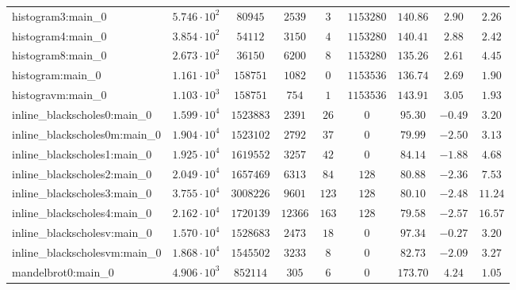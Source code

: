 \begin{tabular}{|l|c|c|c|c|c|c|c|c|}
histogram3:main\_0             & $ 5.746 \cdot 10^{2} $ & $ 80945    $ & $ 2539   $ & $ 3    $ & $ 1153280  $ & $ 140.86      $ & $ 2.90    $ & $ 2.26    $ \\
histogram4:main\_0             & $ 3.854 \cdot 10^{2} $ & $ 54112    $ & $ 3150   $ & $ 4    $ & $ 1153280  $ & $ 140.41      $ & $ 2.88    $ & $ 2.42    $ \\
histogram8:main\_0             & $ 2.673 \cdot 10^{2} $ & $ 36150    $ & $ 6200   $ & $ 8    $ & $ 1153280  $ & $ 135.26      $ & $ 2.61    $ & $ 4.45    $ \\
histogram:main\_0              & $ 1.161 \cdot 10^{3} $ & $ 158751   $ & $ 1082   $ & $ 0    $ & $ 1153536  $ & $ 136.74      $ & $ 2.69    $ & $ 1.90    $ \\
histogravm:main\_0             & $ 1.103 \cdot 10^{3} $ & $ 158751   $ & $ 754    $ & $ 1    $ & $ 1153536  $ & $ 143.91      $ & $ 3.05    $ & $ 1.93    $ \\
inline\_blackscholes0:main\_0  & $ 1.599 \cdot 10^{4} $ & $ 1523883  $ & $ 2391   $ & $ 26   $ & $ 0        $ & $ 95.30       $ & $ -0.49   $ & $ 3.20    $ \\
inline\_blackscholes0m:main\_0 & $ 1.904 \cdot 10^{4} $ & $ 1523102  $ & $ 2792   $ & $ 37   $ & $ 0        $ & $ 79.99       $ & $ -2.50   $ & $ 3.13    $ \\
inline\_blackscholes1:main\_0  & $ 1.925 \cdot 10^{4} $ & $ 1619552  $ & $ 3257   $ & $ 42   $ & $ 0        $ & $ 84.14       $ & $ -1.88   $ & $ 4.68    $ \\
inline\_blackscholes2:main\_0  & $ 2.049 \cdot 10^{4} $ & $ 1657469  $ & $ 6313   $ & $ 84   $ & $ 128      $ & $ 80.88       $ & $ -2.36   $ & $ 7.53    $ \\
inline\_blackscholes3:main\_0  & $ 3.755 \cdot 10^{4} $ & $ 3008226  $ & $ 9601   $ & $ 123  $ & $ 128      $ & $ 80.10       $ & $ -2.48   $ & $ 11.24   $ \\
inline\_blackscholes4:main\_0  & $ 2.162 \cdot 10^{4} $ & $ 1720139  $ & $ 12366  $ & $ 163  $ & $ 128      $ & $ 79.58       $ & $ -2.57   $ & $ 16.57   $ \\
inline\_blackscholesv:main\_0  & $ 1.570 \cdot 10^{4} $ & $ 1528683  $ & $ 2473   $ & $ 18   $ & $ 0        $ & $ 97.34       $ & $ -0.27   $ & $ 3.20    $ \\
inline\_blackscholesvm:main\_0 & $ 1.868 \cdot 10^{4} $ & $ 1545502  $ & $ 3233   $ & $ 8    $ & $ 0        $ & $ 82.73       $ & $ -2.09   $ & $ 3.27    $ \\
mandelbrot0:main\_0            & $ 4.906 \cdot 10^{3} $ & $ 852114   $ & $ 305    $ & $ 6    $ & $ 0        $ & $ 173.70      $ & $ 4.24    $ & $ 1.05    $ \\

\end{tabular}
